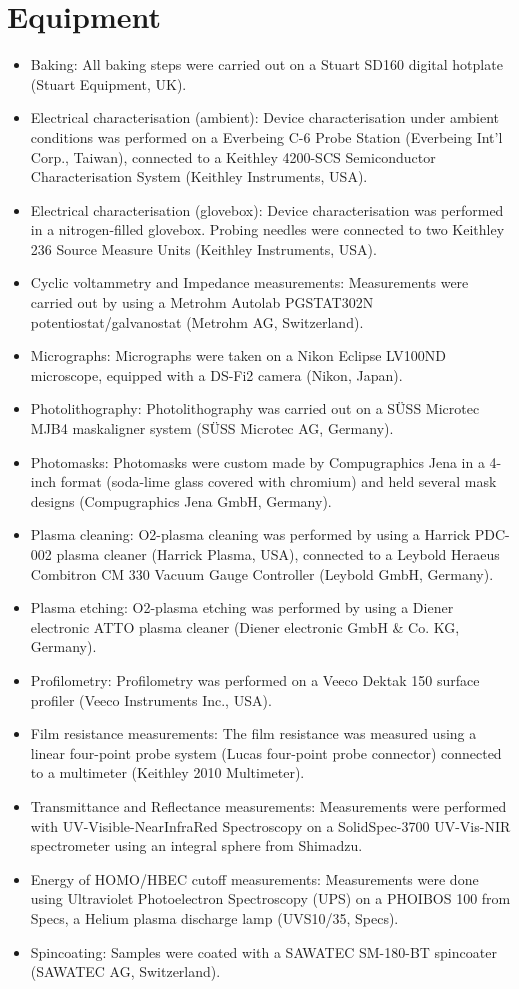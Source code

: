 \section{Equipment}
\begin{itemize}
\item Baking: All baking steps were carried out on a Stuart SD160 digital hotplate (Stuart Equipment, UK). 
\item Electrical characterisation (ambient): Device characterisation under ambient conditions was performed on a Everbeing C-6 Probe Station (Everbeing Int’l Corp., Taiwan), connected to a Keithley 4200-SCS Semiconductor Characterisation System (Keithley Instruments, USA). 
\item Electrical characterisation (glovebox): Device characterisation was performed in a nitrogen-filled glovebox. Probing needles were connected to two Keithley 236 Source Measure Units (Keithley Instruments, USA). 
\item Cyclic voltammetry and Impedance measurements: Measurements were carried out by using a Metrohm Autolab PGSTAT302N potentiostat/galvanostat (Metrohm AG, Switzerland).
\item Micrographs: Micrographs were taken on a Nikon Eclipse LV100ND microscope, equipped with a DS-Fi2 camera (Nikon, Japan). 
\item Photolithography: Photolithography was carried out on a SÜSS Microtec MJB4 maskaligner system (SÜSS Microtec AG, Germany). 
\item Photomasks: Photomasks were custom made by Compugraphics Jena in a 4-inch format (soda-lime glass covered with chromium) and held several mask designs (Compugraphics Jena GmbH, Germany). 
\item Plasma cleaning: O2-plasma cleaning was performed by using a Harrick PDC-002 plasma cleaner (Harrick Plasma, USA), connected to a Leybold Heraeus Combitron CM 330 Vacuum Gauge Controller (Leybold GmbH, Germany). 
\item Plasma etching: O2-plasma etching was performed by using a Diener electronic ATTO plasma cleaner (Diener electronic GmbH \& Co. KG, Germany). 
\item Profilometry: Profilometry was performed on a Veeco Dektak 150 surface profiler (Veeco Instruments Inc., USA).
\item Film resistance measurements: The film resistance was measured using a linear four-point probe system (Lucas four-point probe connector) connected to a multimeter (Keithley 2010 Multimeter).
\item Transmittance and Reflectance measurements: Measurements were performed with UV-Visible-NearInfraRed Spectroscopy on a SolidSpec-3700 UV-Vis-NIR spectrometer using an integral sphere from Shimadzu.
\item Energy of HOMO/HBEC cutoff measurements: Measurements were done using Ultraviolet Photoelectron Spectroscopy (UPS) on a PHOIBOS 100 from Specs, a Helium plasma discharge lamp (UVS10/35, Specs).
\item Spincoating: Samples were coated with a SAWATEC SM-180-BT spincoater (SAWATEC AG, Switzerland).
\end{itemize}


